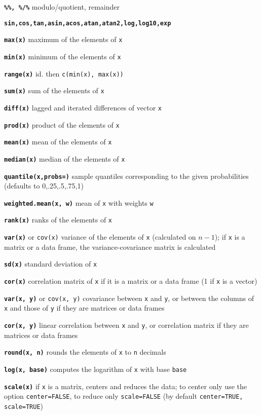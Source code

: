 \documentclass[10pt,landscape]{article}
\newcommand{\code}{\texttt}
\newcommand{\bcode}[1]{\texttt{\textbf{#1}}}
\begin{document}
\begin{multicols*}{3}
\bcode{\%\%, \%/\%} modulo/quotient, remainder

\bcode{sin,cos,tan,asin,acos,atan,atan2,log,log10,exp}

\bcode{max(x)}  maximum of the elements of \code{x}

\bcode{min(x)}  minimum of the elements of \code{x}

\bcode{range(x)}  id. then \code{c(min(x), max(x))}

\bcode{sum(x)}  sum of the elements of \code{x}

\bcode{diff(x)}  lagged and iterated differences of vector \code{x}

\bcode{prod(x)}  product of the elements of \code{x}

\bcode{mean(x)}  mean of the elements of \code{x}

\bcode{median(x)}  median of the elements of \code{x}

\bcode{quantile(x,probs=)} sample quantiles
     corresponding to the given probabilities (defaults to 0,.25,.5,.75,1)

\bcode{weighted.mean(x, w)} mean of \code{x} with weights \code{w}

\bcode{rank(x)}  ranks of the elements of \code{x}

\bcode{var(x)} or \code{cov(x)}  variance of the elements of \code{x}
(calculated on $n-1$); if \code{x} is a matrix or a data frame, the
variance-covariance matrix is calculated

\bcode{sd(x)} standard deviation of \code{x}

\bcode{cor(x)}  correlation matrix of \code{x} if it is a matrix or a
data frame (1 if \code{x} is a vector)

\bcode{var(x, y)} or \code{cov(x, y)}  covariance between \code{x} and \code{y}, or between the columns of \code{x} and those of \code{y} if they are matrices or data frames

\bcode{cor(x, y)}  linear correlation between \code{x} and \code{y}, or correlation matrix if they are matrices or data frames

\bcode{round(x, n)}  rounds the elements of \code{x} to \code{n}
decimals

\bcode{log(x, base)}  computes the logarithm of \code{x} with base \code{base}

\bcode{scale(x)}  if \code{x} is a matrix, centers and reduces the data; to center only use the option \code{center=FALSE}, to reduce only \code{scale=FALSE} (by default \code{center=TRUE, scale=TRUE})


\end{multicols*}
\end{document}
